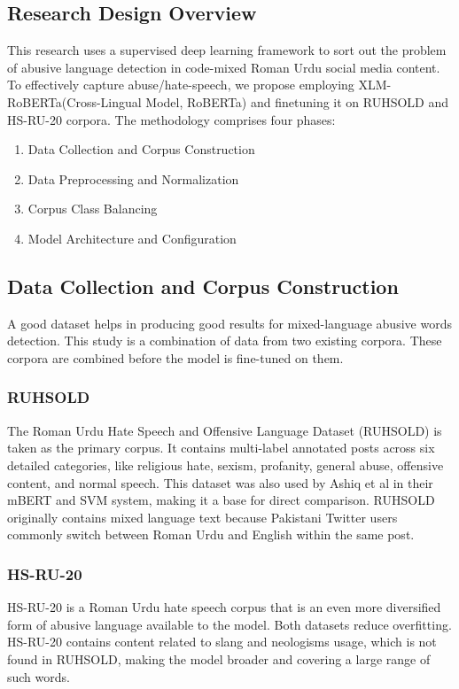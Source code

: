 \documentclass[11pt, a4paper]{article}
\begin{document}
\subsection{Research Design Overview}
This research uses a supervised deep learning framework to sort out the problem of abusive language detection in code-mixed Roman Urdu social media content. To effectively capture abuse/hate-speech, we propose employing XLM-RoBERTa(Cross-Lingual Model, RoBERTa)\cite{xlmrobertaresults} and finetuning it on RUHSOLD\cite{ruhsoldcorpus} and HS-RU-20\cite{hsru20corpus} corpora. 
\newline
The methodology comprises four phases:
\begin{enumerate}
\item Data Collection and Corpus Construction
\item Data Preprocessing and Normalization
\item Corpus Class Balancing
\item Model Architecture and Configuration
\end{enumerate}
\subsection{Data Collection and Corpus Construction}
A good dataset helps in producing good results for mixed-language abusive words detection. This study is a combination of data from two existing corpora. These corpora are combined before the model is fine-tuned on them.
\subsubsection{RUHSOLD}
The Roman Urdu Hate Speech and Offensive Language Dataset (RUHSOLD) is taken as the primary corpus. It contains multi-label annotated posts across six detailed categories, like religious hate, sexism, profanity, general abuse, offensive content, and normal speech. This dataset was also used by Ashiq et al\cite{ashiqetal} in their mBERT and SVM system, making it a base for direct comparison. RUHSOLD originally contains mixed language text because Pakistani Twitter users commonly switch between Roman Urdu and English within the same post.
\subsubsection{HS-RU-20}
HS-RU-20 is a Roman Urdu hate speech corpus that is an even more diversified form of abusive language available to the model\cite{hsru20corpus}. Both datasets reduce overfitting. HS-RU-20 contains content related to slang and neologisms usage, which is not found in RUHSOLD, making the model broader and covering a large range of such words.
\end{document}
